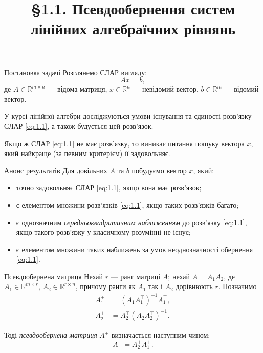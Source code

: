 \title[Псевдообернення СЛАР]
{\S1.1. Псевдообернення систем \\ лінійних алгебраїчних рівнянь}

\begin{frame}
    \titlepage
\end{frame}


\begin{mframe}{Постановка задачі}
    Розглянемо СЛАР вигляду:
    \begin{equation}
        \label{eq:1.1}
        A x = b,
    \end{equation}
    де $A \in \mathbb{R}^{m \times n}$ --- відома матриця, $x \in \mathbb{R}^n$
    --- невідомий вектор, $b \in \mathbb{R}^m$ --- відомий вектор. \medskip

    У курсі лінійної алгебри досліджуються умови існування та єдиності
    розв'язку СЛАР \eqref{eq:1.1}, а також будується цей розв'язок. \medskip

    Якщо ж СЛАР \eqref{eq:1.1} не має розв'язку, то виникає питання пошуку
    вектора $x$, який найкраще (за певним критерієм) її задовольняє.
\end{mframe}

\begin{mframe}{Анонс результатів}
    Для довільних $A$ та $b$ побудуємо вектор $\bar x$, який:
    \begin{itemize}
        \item точно задовольняє СЛАР \eqref{eq:1.1}, якщо вона має розв'язок;
        \item є елементом множини розв'язків \eqref{eq:1.1}, якщо таких
        розв'язків багато;
        \item є однозначним \textit{середньоквадратичним наближенням} до
        розв'язку \eqref{eq:1.1}, якщо такого розв'язку у класичному розумінні
        не існує;
        \item є елементом множини таких наближень за умов неоднозначності
        обернення \eqref{eq:1.1}.
    \end{itemize}
\end{mframe}

\begin{mframe}{Псевдообернена матриця}
    Нехай $r$ --- ранг матриці $A$; нехай $A = A_1 A_2$, де
    $A_1 \in \mathbb{R}^{m \times r}$, $A_2 \in \mathbb{R}^{r \times n}$,
    причому ранги як $A_1$ так і $A_2$ дорівнюють $r$. Позначимо
    \begin{align}
        \label{eq:1.6a}
        A_1^+ &= (A_1 A_1^\intercal)^{-1} A_1^\intercal, \\
        \label{eq:1.6b}
        A_2^+ &= A_2^\intercal (A_2 A_2^\intercal)^{-1}.
    \end{align}

    Тоді \textit{псевдообернена матриця} $A^+$ визначається наступним чином: 
    \begin{equation}
        \label{eq:1.5}
        A^+ = A_2^+ A_1^+.
    \end{equation}
\end{mframe}

